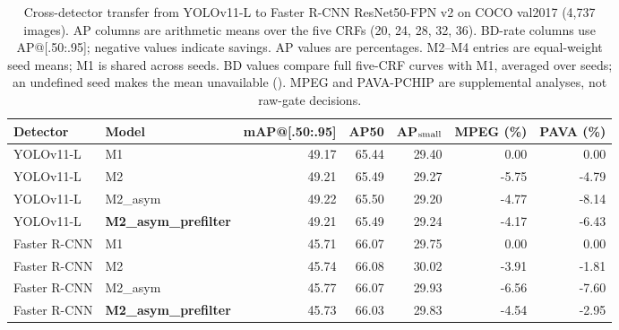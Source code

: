 \begin{table}[t]
\centering
\small
\setlength{\tabcolsep}{3pt}
\caption{Cross-detector transfer from YOLOv11-L to Faster R-CNN ResNet50-FPN v2 on COCO val2017 (4,737 images). AP columns are arithmetic means over the five CRFs (20, 24, 28, 32, 36). BD-rate columns use AP@[.50:.95]; negative values indicate savings. AP values are percentages. M2--M4 entries are equal-weight seed means; M1 is shared across seeds. BD values compare full five-CRF curves with M1, averaged over seeds; an undefined seed makes the mean unavailable (\textemdash). MPEG and PAVA-PCHIP are supplemental analyses, not raw-gate decisions. }
\label{tab:cross-detector}
\begin{tabular}{llrrrrr}
\toprule
Detector & Model & mAP@[.50:.95] & AP50 & AP$_{\rm small}$ & MPEG (\%) & PAVA (\%) \\
\midrule
YOLOv11-L & M1 & 49.17 & 65.44 & 29.40 & 0.00 & 0.00 \\
YOLOv11-L & M2 & 49.21 & 65.49 & 29.27 & -5.75 & -4.79 \\
YOLOv11-L & M2_asym & 49.22 & 65.50 & 29.20 & -4.77 & -8.14 \\
YOLOv11-L & \textbf{M2_asym_prefilter} & 49.21 & 65.49 & 29.24 & -4.17 & -6.43 \\
\midrule
Faster R-CNN & M1 & 45.71 & 66.07 & 29.75 & 0.00 & 0.00 \\
Faster R-CNN & M2 & 45.74 & 66.08 & 30.02 & -3.91 & -1.81 \\
Faster R-CNN & M2_asym & 45.77 & 66.07 & 29.93 & -6.56 & -7.60 \\
Faster R-CNN & \textbf{M2_asym_prefilter} & 45.73 & 66.03 & 29.83 & -4.54 & -2.95 \\
\bottomrule
\end{tabular}
\end{table}

